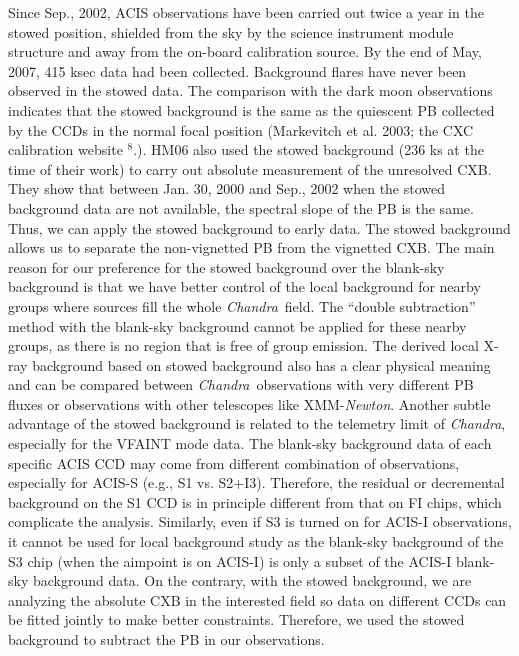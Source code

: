 \documentclass{aastex}
\def\chandra    {{\em Chandra}\/}
\def\xmm        {XMM-{\em Newton}\/}
\begin{document}
\begin{appendix}
Since Sep., 2002, ACIS observations have been carried out twice a year in the
stowed position, shielded from the sky by the science instrument module
structure and away from the on-board calibration source. By the end of May, 2007,
415 ksec data had been collected.
Background flares have never been observed in the stowed data.
The comparison with the dark moon observations indicates that the stowed background
is the same as the quiescent PB collected by the CCDs in the normal
focal position (Markevitch et al. 2003; the CXC calibration website  $^{8}$.).
HM06 also used the stowed background (236 ks at the time of their work)
to carry out absolute measurement of the unresolved CXB.
They show that between Jan. 30, 2000 and Sep., 2002 when the stowed background
data are not available, the spectral slope of the PB is the same.
Thus, we can apply the stowed background to early data.
The stowed background allows us to separate the non-vignetted PB from the vignetted CXB.
The main reason for our preference for the stowed background over the blank-sky
background is that we have better control of the local background for nearby
groups where sources fill the whole \chandra\ field. The ``double subtraction''
method with the blank-sky background cannot be applied for these nearby groups, as
there is no region that is free of group emission. The derived local X-ray background
based on stowed background also has a clear physical meaning and can be compared
between \chandra\ observations with very different PB fluxes or observations with
other telescopes like \xmm. Another subtle advantage of the stowed background
is related to the telemetry limit of \chandra, especially for the VFAINT mode data.
The blank-sky background data of each specific ACIS CCD may come from different
combination of observations, especially for ACIS-S (e.g., S1 vs. S2+I3). Therefore,
the residual or decremental background on the S1 CCD is in principle different
from that on FI chips, which complicate the analysis. Similarly, even if S3 is turned
on for ACIS-I observations, it cannot be used for local background study as the
blank-sky background of the S3 chip (when the aimpoint is on ACIS-I) is only a subset
of the ACIS-I blank-sky background data. On the contrary, with the stowed background,
we are analyzing the absolute CXB in the interested field so data on different CCDs
can be fitted jointly to make better constraints.
Therefore, we used the stowed background to subtract the PB in our observations.


\end{appendix}
\end{document}
